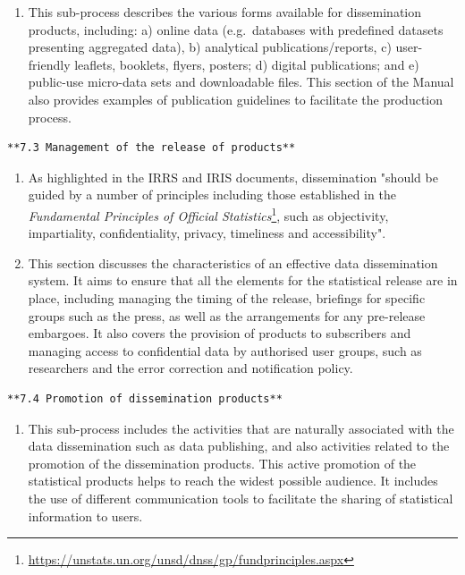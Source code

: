 \documentclass[
]{article}
\providecommand{\tightlist}{%
  \setlength{\itemsep}{0pt}\setlength{\parskip}{0pt}}
\begin{document}
\begin{enumerate}
\def\labelenumi{\arabic{enumi}.}
\setcounter{enumi}{489}
\tightlist
\item
  This sub-process describes the various forms available for
  dissemination products, including: a) online data (e.g.~databases
  with predefined datasets presenting aggregated data), b) analytical
  publications/reports, c) user-friendly leaflets, booklets, flyers,
  posters; d) digital publications; and e) public-use micro-data sets
  and downloadable files. This section of the Manual also provides
  examples of publication guidelines to facilitate the production
  process.
\end{enumerate}

\begin{verbatim}
**7.3 Management of the release of products**
\end{verbatim}

\begin{enumerate}
\def\labelenumi{\arabic{enumi}.}
\setcounter{enumi}{490}
\item
  As highlighted in the IRRS and IRIS documents, dissemination
  "should be guided by a number of principles including those
  established in the \emph{Fundamental Principles of Official
  Statistics}\footnote{\url{https://unstats.un.org/unsd/dnss/gp/fundprinciples.aspx}}, such as objectivity, impartiality, confidentiality,
  privacy, timeliness and accessibility".
\item
  This section discusses the characteristics of an effective data
  dissemination system. It aims to ensure that all the elements for
  the statistical release are in place, including managing the timing
  of the release, briefings for specific groups such as the press, as
  well as the arrangements for any pre-release embargoes. It also
  covers the provision of products to subscribers and managing access
  to confidential data by authorised user groups, such as researchers
  and the error correction and notification policy.
\end{enumerate}

\begin{verbatim}
**7.4 Promotion of dissemination products**
\end{verbatim}

\begin{enumerate}
\def\labelenumi{\arabic{enumi}.}
\setcounter{enumi}{492}
\tightlist
\item
  This sub-process includes the activities that are naturally
  associated with the data dissemination such as data publishing, and
  also activities related to the promotion of the dissemination
  products. This active promotion of the statistical products helps to
  reach the widest possible audience. It includes the use of different
  communication tools to facilitate the sharing of statistical
  information to users.
\end{enumerate}
\end{document}

